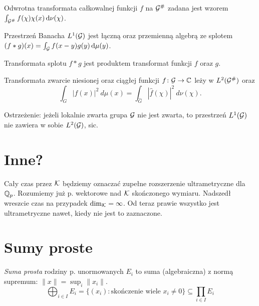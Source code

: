 \begin{definicja}
	Odwrotna transformata całkowalnej funkcji $f$ na $\mathcal G^\#$ zadana jest wzorem $\int_{\mathcal G^\#} f(\chi) \chi(x) \,\textrm{d} \nu(\chi)$.
\end{definicja}


\begin{fakt}
	Przestrzeń Banacha $L^1(\mathcal G)$ jest łączną oraz przemienną algebrą ze splotem $(f * g)(x) = \int_{\mathcal G} f(x- y) g(y) \,\textrm{d}\mu(y)$.
\end{fakt}

\begin{fakt}
	Transformata splotu $f * g$ jest produktem transformat funkcji $f$ oraz $g$.
\end{fakt}

\begin{twierdzenie}[Plancherel]
	Transformata zwarcie niesionej oraz ciągłej funkcji $f \colon \mathcal G \to \mathbb C$ leży w $L^2(\mathcal G^\#)$ oraz
	\[
		\int_G |f(x)|^2 \ d \mu(x) = \int_{\widehat{G}} \left |\widehat{f}(\chi) \right |^2 \ d \nu(\chi).
	\]
\end{twierdzenie}

Ostrzeżenie: jeżeli lokalnie zwarta grupa $\mathcal G$ nie jest zwarta, to przestrzeń $L^1(\mathcal G)$ nie zawiera w sobie $L^2(\mathcal G)$, sic.

\section{Inne?}

Cały czas przez $\mathcal K$ będziemy oznaczać zupełne rozszerzenie ultrametryczne dla $\mathbb Q_p$.
Rozumiemy już p. wektorowe nad $\mathcal K$ skończonego wymiaru.
Nadszedł wreszcie czas na przypadek $\dim_\mathcal K = \infty$.
Od teraz prawie wszystko jest ultrametryczne nawet, kiedy nie jest to zaznaczone.

\section{Sumy proste}
\begin{definicja}
	\emph{Suma prosta} rodziny p. unormowanych $E_i$ to suma (algebraiczna) z normą supremum: $\|x\| = \sup_i \|x_i\|$.
	\[
		\bigoplus_{i \in I} E_i = \{(x_i) : \mbox{skończenie wiele } x_i \neq 0\} \subseteq \prod_{i \in I} E_i
	\]
\end{definicja}

